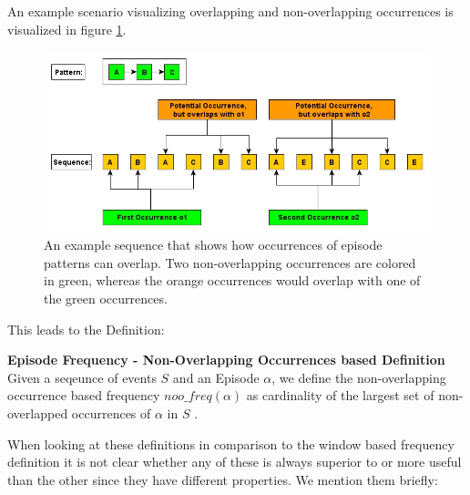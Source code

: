 An example scenario visualizing overlapping and non-overlapping occurrences is visualized in figure \ref{fig_nonOverlappingExample}.


\begin{figure}[h]
	\centering
  	\includegraphics[width=\textwidth]{nonOverlappingExample}
	\caption{An example sequence that shows how occurrences of episode patterns can overlap. Two non-overlapping occurrences are colored in green, whereas the orange occurrences would overlap with one of the green occurrences.}
	\label{fig_nonOverlappingExample}
\end{figure}

This leads to the Definition:

\begin{mydef}
\label{def_nonOverlappingFrequency}
\textbf{Episode Frequency - Non-Overlapping Occurrences based Definition} Given a seqeunce of events $S$ and an Episode $\alpha$, we define the non-overlapping occurrence based frequency $noo\_freq(\alpha )$ as cardinality of the largest set of non-overlapped occurrences of $\alpha$ in $S$ \cite{laxman2007fast}.
\end{mydef}


When looking at these definitions in comparison to the window based frequency definition it is not clear whether any of these is always superior to or more useful than the other since they have different properties. We mention them briefly:

